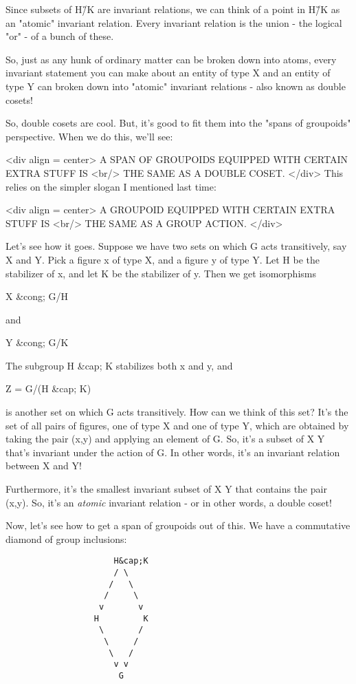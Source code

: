 Since subsets of H\G/K are invariant relations, we can think of a 
point in H\G/K as an "atomic" invariant relation.   Every invariant 
relation is the union - the logical "or" - of a bunch of these. 

So, just as any hunk of ordinary matter can be broken down into atoms,
every invariant statement you can make about an entity of type X and
an entity of type Y can broken down into "atomic" invariant
relations - also known as double cosets!

So, double cosets are cool.  But, it's good to fit them into the "spans
of groupoids" perspective.  When we do this, we'll see:

<div align = center>
          A SPAN OF GROUPOIDS EQUIPPED WITH CERTAIN EXTRA STUFF IS <br/>
                       THE SAME AS A DOUBLE COSET.
</div>
This relies on the simpler slogan I mentioned last time:

<div align = center>
             A GROUPOID EQUIPPED WITH CERTAIN EXTRA STUFF IS <br/>
                     THE SAME AS A GROUP ACTION.
</div>

Let's see how it goes.  Suppose we have two sets on which G acts
transitively, say X and Y.  Pick a figure x of type X, and a figure
y of type Y.  Let H be the stabilizer of x, and let K be the
stabilizer of y.  Then we get isomorphisms

X &cong; G/H 

and 

Y &cong; G/K

The subgroup H &cap; K stabilizes both x and y, and

Z = G/(H &cap; K)

is another set on which G acts transitively.  How can we think of this 
set?  It's the set of all pairs of figures, one of type X and one of 
type Y, which are obtained by taking the pair (x,y) and applying
an element of G.  So, it's a subset of X \times  Y that's invariant under
the action of G.  In other words, it's an invariant relation between
X and Y!  

Furthermore, it's the smallest invariant subset of X \times  Y that contains
the pair (x,y).  So, it's an \emph{atomic} invariant relation - or in other
words, a double coset!  
  
Now, let's see how to get a span of groupoids out of this.  We have
a commutative diamond of group inclusions:

\begin{verbatim}
                      H&cap;K
                      / \
                     /   \
                    /     \
                   v       v
                  H         K
                   \       /
                    \     /
                     \   /
                      v v
                       G
\end{verbatim}
    
